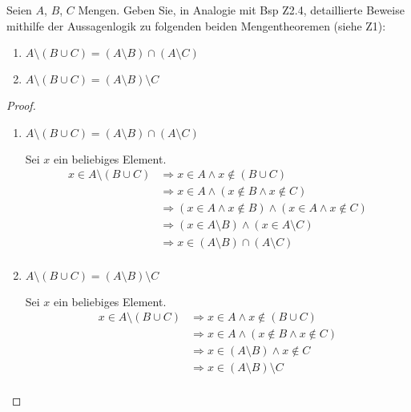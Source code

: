 \documentclass{../problemset}
\author{Michael van Straten}
\begin{document}
\maketitle

\begin{problem}
Seien $A$, $B$, $C$ Mengen. Geben Sie, in Analogie mit Bsp Z2.4, detaillierte Beweise mithilfe der Aussagenlogik zu folgenden beiden Mengentheoremen (siehe Z1):
\begin{enumerate}
	\item $A \setminus (B \cup C) = (A \setminus B) \cap (A \setminus C)$
	\item $A \setminus (B \cup C) = (A \setminus B) \setminus C$
\end{enumerate}
\begin{proof}
	$ $
	\begin{enumerate}
		\item $A \setminus (B \cup C) = (A \setminus B) \cap (A \setminus C)$

		      Sei $x$ ein beliebiges Element.
		      \begin{align*}
			      x \in A \setminus (B \cup C) & \Longrightarrow x \in A \land x \not \in (B \cup C)                             \\
			                                   & \Longrightarrow x \in A \land (x \not \in B \land x \not \in C)                 \\
			                                   & \Longrightarrow (x \in A \land x \not \in B) \land (x \in A \land x \not \in C) \\
			                                   & \Longrightarrow (x \in A \setminus B) \land (x \in A \setminus C)               \\
			                                   & \Longrightarrow x \in (A \setminus B) \cap (A \setminus C) \tag{\checkmark}     \\
		      \end{align*}

		\item $A \setminus (B \cup C) = (A \setminus B) \setminus C$

		      Sei $x$ ein beliebiges Element.
		      \begin{align*}
			      x \in A \setminus (B \cup C) & \Longrightarrow x \in A \land x \not\in (B \cup C)                 \\
			                                   & \Longrightarrow x \in A \land (x \not\in B \land x \not\in C)      \\
			                                   & \Longrightarrow x \in (A \setminus B) \land x \not\in C            \\
			                                   & \Longrightarrow x \in (A \setminus B) \setminus C \tag{\checkmark} \\
		      \end{align*}
	\end{enumerate}
\end{proof}
\end{problem}
\end{document}
